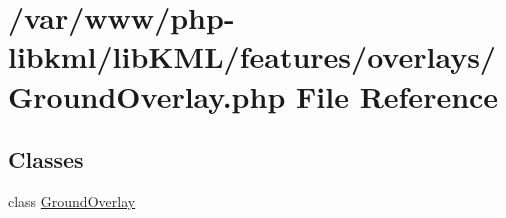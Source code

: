 \hypertarget{GroundOverlay_8php}{
\section{/var/www/php-\/libkml/libKML/features/overlays/GroundOverlay.php File Reference}
\label{d1/d13/GroundOverlay_8php}
}
\subsection*{Classes}
\begin{DoxyCompactItemize}
\item 
class \hyperlink{classGroundOverlay}{GroundOverlay}
\end{DoxyCompactItemize}
